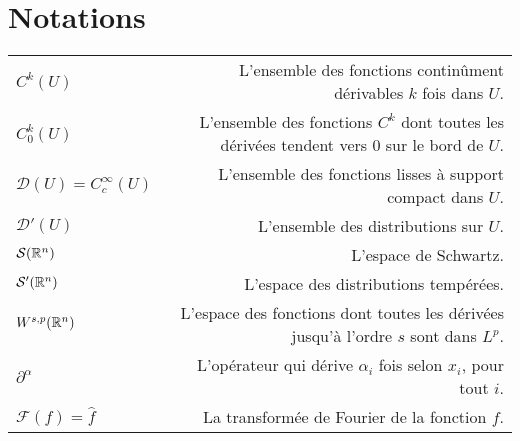 


\setcounter{tocdepth}{2} %

\setcounter{secnumdepth}{3} %

\manualmark
\markboth{\spacedlowsmallcaps{\contentsname}}{\spacedlowsmallcaps{\contentsname}}
\tableofcontents 
{}
\renewcommand{\chaptermark}[1]{\markboth{\spacedlowsmallcaps{#1}}{\spacedlowsmallcaps{#1}}}
\renewcommand{\sectionmark}[1]{\markright{\thesection\enspace\spacedlowsmallcaps{#1}}}

\clearpage

      

\chapter*{Notations}
\begin{tabular}{lr}
  $C^k(U)$ & L'ensemble des fonctions continûment dérivables $k$ fois dans $U$.\\
  $C^k_0(U)$ & L'ensemble des fonctions $C^k$ dont toutes les dérivées tendent vers $0$ sur le bord de $U$.\\
  $\mathcal{D}(U) = C^{\infty}_c(U)$ & L'ensemble des fonctions lisses à support compact dans $U$.\\
  $\mathcal{D}'(U) $ & L'ensemble des distributions sur $U$.\\
  $\mathcal{S}(\mathbb{R}^n)$ & L'espace de Schwartz.\\
  $\mathcal{S}'(\mathbb{R}^n)$ & L'espace des distributions tempérées.\\
  $W^{s,p}(\mathbb{R}^n)$ & L'espace des fonctions dont toutes les dérivées jusqu'à l'ordre $s$ sont dans $L^p$.\\
  $\partial^{\alpha}$ & L'opérateur qui dérive $\alpha_i$ fois selon $x_i$, pour tout $i$.\\
  $\mathcal{F}(f)=\hat{f}$ & La transformée de Fourier de la fonction $f$.\\
  
\end{tabular}
